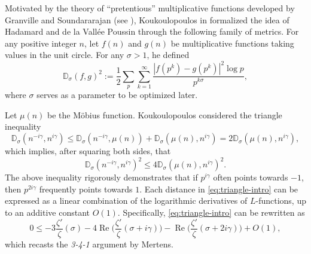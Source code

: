 \documentclass[12pt,reqno]{amsart}
\theoremstyle{remark}
\DeclareMathOperator{\Real}{Re}
\numberwithin{equation}{section}
\begin{document}
	Motivated by the theory of ``pretentious'' multiplicative functions developed by Granville and Soundararajan (see \cite{GS}),  Koukoulopoulos in \cite[Theorem 8.3]{D} formalized the idea of Hadamard and de la Vall\'ee Poussin through the following family of metrics. For any positive integer $n$, let $f(n)$ and $g(n)$ be multiplicative functions taking values in the unit circle. For any $\sigma > 1$, he defined 
	\begin{equation}\label{def:distance}
		{\mathbb{D}}_{\sigma}(f,g)^2 := \frac{1}{2} \sum_{p}\sum_{k=1}^{\infty} \frac{|f(p^k)-g(p^k)|^2\log p }{p^{k\sigma}},  
	\end{equation}
	where $\sigma$ serves as a parameter to be optimized later.  
	
	Let $\mu(n)$ be the M\"obius function. Koukoulopoulos considered the triangle inequality
    \[
    {\mathbb{D}}_{\sigma}(n^{-i\gamma},n^{i\gamma}) \le {\mathbb{D}}_{\sigma}(n^{-i\gamma},\mu(n)) +{\mathbb{D}}_{\sigma}(\mu(n),n^{i\gamma}) = 2{\mathbb{D}}_{\sigma}(\mu(n),n^{i\gamma}),
    \]
    which implies, after squaring both sides, that
	\begin{equation}
    \label{eq:triangle-intro}
        {\mathbb{D}}_{\sigma}(n^{-i\gamma},n^{i\gamma})^2\le 4{\mathbb{D}}_{\sigma}(\mu(n),n^{i\gamma})^2.
	\end{equation}
	The above inequality  rigorously demonstrates that if $p^{i\gamma}$ often points towards $-1$, then $p^{2i\gamma}$  frequently points towards $1$. Each distance in \eqref{eq:triangle-intro} can be expressed as a linear combination of the logarithmic derivatives of $L$-functions, up to an additive constant  $O(1)$. Specifically, \eqref{eq:triangle-intro} can be rewritten as
	\begin{equation*}%
	    0 \le -3\frac{\zeta'}{\zeta}(\sigma) -4\Real\Big(\frac{\zeta'}{\zeta}(\sigma+i\gamma)\Big)-\Real\Big(\frac{\zeta'}{\zeta}(\sigma+2i\gamma)\Big)+O(1),
	\end{equation*}
	which recasts the \textit{3-4-1} argument by Mertens. 
	
\end{document}
